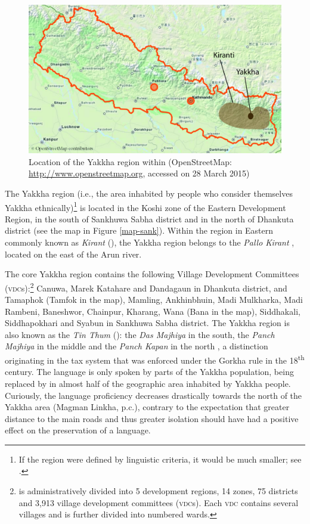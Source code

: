 \begin{figure}
\centering
\includegraphics[width=.95\textwidth]{figures/Nepalmap.png}%
\caption{Location of the Yakkha region within  (OpenStreetMap: \url{http://www.openstreetmap.org}, accessed on 28 March 2015)}\label{nepalmap}
\end{figure}

The Yakkha region (i.e., the area inhabited by people who consider themselves Yakkha ethnically)\footnote{If the region were defined by linguistic criteria, it would be much smaller; see .} is located in the Koshi zone of the Eastern Development Region, in the south of Sankhuwa Sabha district and in the north of Dhankuta  district  (see the map in Figure \ref{map-sank}). Within the region in  Eastern  commonly known as \emph{Kirant} (), the Yakkha region belongs to the \emph{Pallo Kirant} , located on the east of the Arun river. 

The core Yakkha region contains the following Village Development Committees (\textsc{vdc}s):\footnote{ is administratively divided into 5 development regions, 14 zones, 75 districts and  3,913 village development committees (\textsc{vdc}s). Each \textsc{vdc}  contains several villages and is further divided into numbered wards.} Canuwa, Marek Katahare and Dandagaun in Dhankuta district, and Tamaphok (Tamfok in the map), Mamling, Ankhinbhuin, Madi Mulkharka, Madi Rambeni, Baneshwor, Chainpur, Kharang, Wana (Bana in the map), Siddhakali, Siddhapokhari and Syabun in Sankhuwa Sabha district. The Yakkha region is also known as the \emph{Tin Thum} (): the \emph{Das Majhiya} in the south, the \emph{Panch Majhiya} in the middle and the \emph{Panch Kapan} in the north  \citep[86]{Kongren2007Indigenous}, a distinction originating in the tax system that was enforced under the Gorkha rule in the 18\textsuperscript{th} century. The language is  only spoken by parts of the Yakkha population, being replaced by  in almost half of the geographic area inhabited by Yakkha people. Curiously, the language proficiency decreases drastically towards the north of the Yakkha area (Magman Linkha, p.c.), contrary to the expectation that greater distance to the main roads and thus greater isolation should have had a positive effect on the preservation of a language. 


